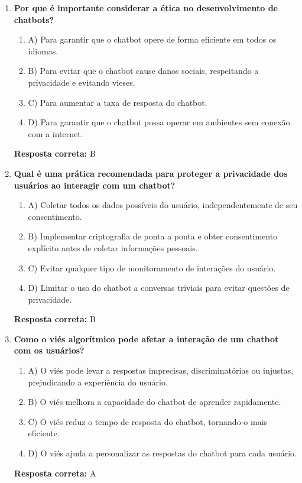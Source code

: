 \documentclass[14pt,a4paper,oneside]{book}
\begin{document}
\begin{enumerate}
	
	\item \textbf{Por que é importante considerar a ética no desenvolvimento de chatbots?}
	\begin{enumerate}[label=\alph*)]
		\item A) Para garantir que o chatbot opere de forma eficiente em todos os idiomas.
		\item B) Para evitar que o chatbot cause danos sociais, respeitando a privacidade e evitando vieses.
		\item C) Para aumentar a taxa de resposta do chatbot.
		\item D) Para garantir que o chatbot possa operar em ambientes sem conexão com a internet.
	\end{enumerate}
	\vspace{5mm}
	\textbf{Resposta correta:} B
	
	\item \textbf{Qual é uma prática recomendada para proteger a privacidade dos usuários ao interagir com um chatbot?}
	\begin{enumerate}[label=\alph*)]
		\item A) Coletar todos os dados possíveis do usuário, independentemente de seu consentimento.
		\item B) Implementar criptografia de ponta a ponta e obter consentimento explícito antes de coletar informações pessoais.
		\item C) Evitar qualquer tipo de monitoramento de interações do usuário.
		\item D) Limitar o uso do chatbot a conversas triviais para evitar questões de privacidade.
	\end{enumerate}
	\vspace{5mm}
	\textbf{Resposta correta:} B
	
	\item \textbf{Como o viés algorítmico pode afetar a interação de um chatbot com os usuários?}
	\begin{enumerate}[label=\alph*)]
		\item A) O viés pode levar a respostas imprecisas, discriminatórias ou injustas, prejudicando a experiência do usuário.
		\item B) O viés melhora a capacidade do chatbot de aprender rapidamente.
		\item C) O viés reduz o tempo de resposta do chatbot, tornando-o mais eficiente.
		\item D) O viés ajuda a personalizar as respostas do chatbot para cada usuário.
	\end{enumerate}
	\vspace{5mm}
	\textbf{Resposta correta:} A
	

\end{enumerate}
\end{document}
